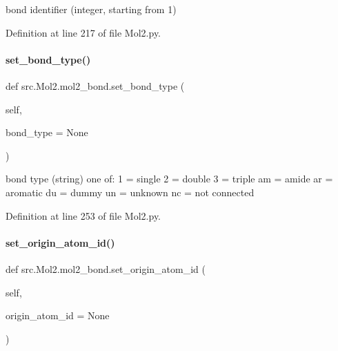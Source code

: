 bond identifier (integer, starting from 1) 



Definition at line 217 of file Mol2.\+py.

\mbox{\label{classsrc_1_1Mol2_1_1mol2__bond_aee8fcdcc674648c140ef84f5562cbe9c}} 
\paragraph{\texorpdfstring{set\+\_\+bond\+\_\+type()}{set\_bond\_type()}}
{\footnotesize\ttfamily def src.\+Mol2.\+mol2\+\_\+bond.\+set\+\_\+bond\+\_\+type (\begin{DoxyParamCaption}\item[{}]{self,  }\item[{}]{bond\+\_\+type = {\ttfamily None} }\end{DoxyParamCaption})}



bond type (string) one of\+: 1 = single 2 = double 3 = triple am = amide ar = aromatic du = dummy un = unknown nc = not connected 



Definition at line 253 of file Mol2.\+py.

\mbox{\label{classsrc_1_1Mol2_1_1mol2__bond_af68218cad88736c51ce5efde940e9ad8}} 
\paragraph{\texorpdfstring{set\+\_\+origin\+\_\+atom\+\_\+id()}{set\_origin\_atom\_id()}}
{\footnotesize\ttfamily def src.\+Mol2.\+mol2\+\_\+bond.\+set\+\_\+origin\+\_\+atom\+\_\+id (\begin{DoxyParamCaption}\item[{}]{self,  }\item[{}]{origin\+\_\+atom\+\_\+id = {\ttfamily None} }\end{DoxyParamCaption})}



